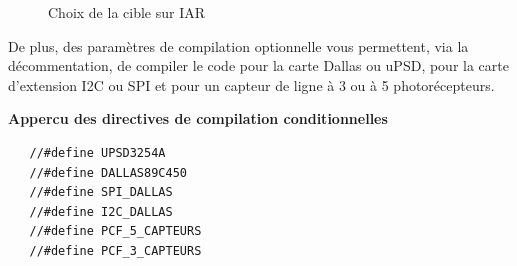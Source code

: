 \documentclass[10pt,a4paper,final]{article}
\begin{document}
\begin{spacing}{1.5}
\begin{figure}[hbtp]
\caption{Choix de la cible sur IAR}
\centering
{}
\end{figure}

De plus, des paramètres de compilation optionnelle vous permettent, via la décommentation, de compiler le code pour la carte Dallas ou uPSD, pour la carte d'extension I2C ou SPI et pour un capteur de ligne à 3 ou à 5 photorécepteurs.\\
\end{spacing}
\textbf{Appercu des directives de compilation conditionnelles}
\begin{lstlisting}
   //#define UPSD3254A
   //#define DALLAS89C450
   //#define SPI_DALLAS
   //#define I2C_DALLAS
   //#define PCF_5_CAPTEURS
   //#define PCF_3_CAPTEURS
\end{lstlisting}
\end{document}
